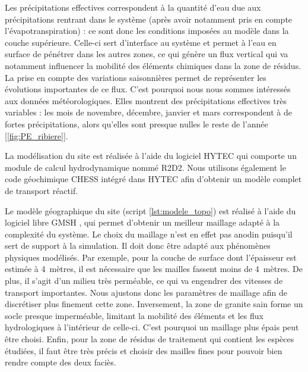 \documentclass{article}
\newcommand{\blue}[1]{\textcolor{blue}{#1}} %
\begin{document}
Les précipitations effectives correspondent à la quantité d'eau due aux précipitations rentrant dans le système (après avoir notamment pris en compte l'évapotranspiration) : ce sont donc les conditions imposées au modèle dans la couche supérieure. Celle-ci sert d'interface au système et permet à l'eau en surface de pénétrer dans les autres zones, ce qui génère un flux vertical qui va notamment influencer la mobilité des éléments chimiques dans la zone de résidus. 
La prise en compte des variations saisonnières permet de représenter les évolutions importantes de ce flux.
C'est pourquoi nous nous sommes intéressés aux données météorologiques. Elles montrent des précipitations effectives très variables : les mois de novembre, décembre, janvier et mars correspondent à de fortes précipitations, alors qu’elles sont presque nulles le reste de l’année [\ref{fig:PE_ribiere}].

La modélisation du site est réalisée à l'aide du logiciel HYTEC qui comporte un module de calcul hydrodynamique nommé R2D2. Nous utilisons également le code géochimique CHESS intégré dans HYTEC \cite{van_der_lee_module-oriented_2003} afin d'obtenir un modèle complet de transport réactif.

Le modèle géographique du site (script \ref{lst:modele_topo}) est réalisé à l'aide du logiciel libre GMSH \cite{geuzaine_gmsh}, qui permet d'obtenir un meilleur maillage adapté à la complexité du système. Le choix du maillage n'est en effet pas anodin puisqu'il sert de support à la simulation. Il doit donc être adapté aux phénomènes physiques modélisés. Par exemple, pour la couche de surface dont l'épaisseur est estimée à 4~mètres, il est nécessaire que les mailles fassent moins de 4~mètres. De plus, il s'agit d'un milieu très perméable, ce qui va engendrer des vitesses de transport importantes. Nous ajustons donc les paramètres de maillage afin de discrétiser plus finement cette zone. Inversement, la zone de granite sain forme un socle presque imperméable, limitant la mobilité des éléments et les flux hydrologiques à l'intérieur de celle-ci. C'est pourquoi un maillage plus épais peut être choisi. Enfin, pour la zone de résidus de traitement qui contient les espèces étudiées, il faut être très précis et choisir des mailles fines pour pouvoir bien rendre compte des deux faciès.

\end{document}
